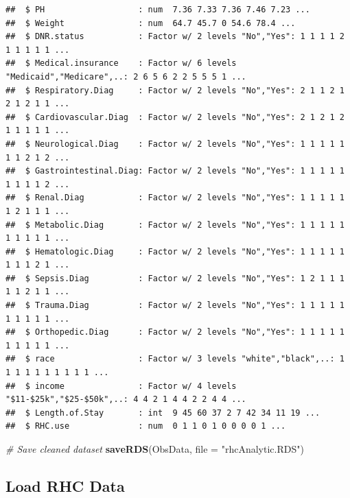 \documentclass[
]{article}
\newenvironment{Shaded}{\begin{snugshade}}{\end{snugshade}}
\newcommand{\AttributeTok}[1]{\textcolor[rgb]{0.13,0.29,0.53}{#1}}
\newcommand{\CommentTok}[1]{\textcolor[rgb]{0.56,0.35,0.01}{\textit{#1}}}
\newcommand{\FunctionTok}[1]{\textcolor[rgb]{0.13,0.29,0.53}{\textbf{#1}}}
\newcommand{\NormalTok}[1]{#1}
\newcommand{\StringTok}[1]{\textcolor[rgb]{0.31,0.60,0.02}{#1}}
\begin{document}
\begin{verbatim}
##  $ PH                   : num  7.36 7.33 7.36 7.46 7.23 ...
##  $ Weight               : num  64.7 45.7 0 54.6 78.4 ...
##  $ DNR.status           : Factor w/ 2 levels "No","Yes": 1 1 1 1 2 1 1 1 1 1 ...
##  $ Medical.insurance    : Factor w/ 6 levels "Medicaid","Medicare",..: 2 6 5 6 2 2 5 5 5 1 ...
##  $ Respiratory.Diag     : Factor w/ 2 levels "No","Yes": 2 1 1 2 1 2 1 2 1 1 ...
##  $ Cardiovascular.Diag  : Factor w/ 2 levels "No","Yes": 2 1 2 1 2 1 1 1 1 1 ...
##  $ Neurological.Diag    : Factor w/ 2 levels "No","Yes": 1 1 1 1 1 1 1 2 1 2 ...
##  $ Gastrointestinal.Diag: Factor w/ 2 levels "No","Yes": 1 1 1 1 1 1 1 1 1 2 ...
##  $ Renal.Diag           : Factor w/ 2 levels "No","Yes": 1 1 1 1 1 1 2 1 1 1 ...
##  $ Metabolic.Diag       : Factor w/ 2 levels "No","Yes": 1 1 1 1 1 1 1 1 1 1 ...
##  $ Hematologic.Diag     : Factor w/ 2 levels "No","Yes": 1 1 1 1 1 1 1 1 2 1 ...
##  $ Sepsis.Diag          : Factor w/ 2 levels "No","Yes": 1 2 1 1 1 1 1 2 1 1 ...
##  $ Trauma.Diag          : Factor w/ 2 levels "No","Yes": 1 1 1 1 1 1 1 1 1 1 ...
##  $ Orthopedic.Diag      : Factor w/ 2 levels "No","Yes": 1 1 1 1 1 1 1 1 1 1 ...
##  $ race                 : Factor w/ 3 levels "white","black",..: 1 1 1 1 1 1 1 1 1 1 ...
##  $ income               : Factor w/ 4 levels "$11-$25k","$25-$50k",..: 4 4 2 1 4 4 2 2 4 4 ...
##  $ Length.of.Stay       : int  9 45 60 37 2 7 42 34 11 19 ...
##  $ RHC.use              : num  0 1 1 0 1 0 0 0 0 1 ...
\end{verbatim}

\begin{Shaded}
\begin{Highlighting}[]
\CommentTok{\# Save cleaned dataset}
\FunctionTok{saveRDS}\NormalTok{(ObsData, }\AttributeTok{file =} \StringTok{"rhcAnalytic.RDS"}\NormalTok{)}
\end{Highlighting}
\end{Shaded}

\subsection{Load RHC Data}\label{load-rhc-data}
\end{document}
